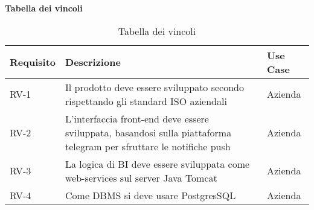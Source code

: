 \begin{table}
\begin{center}
\textbf{Tabella dei vincoli}
\end{center}
\begin{tabular}{ |p{2cm}|p{8cm}|p{2cm}| }
 \hline
\textbf{ Requisito}   &  \textbf{Descrizione}    &  \textbf{    Use Case} \\ 
\hline

RV-1 &  Il prodotto deve essere sviluppato secondo rispettando  gli standard ISO aziendali & Azienda \\
\hline
RV-2 &  L'interfaccia front-end deve essere sviluppata, basandosi sulla piattaforma telegram per sfruttare le notifiche push  & Azienda \\
\hline
RV-3 &  La logica di BI deve essere sviluppata come web-services sul server Java Tomcat& Azienda \\
\hline
RV-4 & Come DBMS si deve usare PostgresSQL & Azienda \\
\hline
\end{tabular}
\\
\caption{Tabella dei vincoli}
\end{table}











